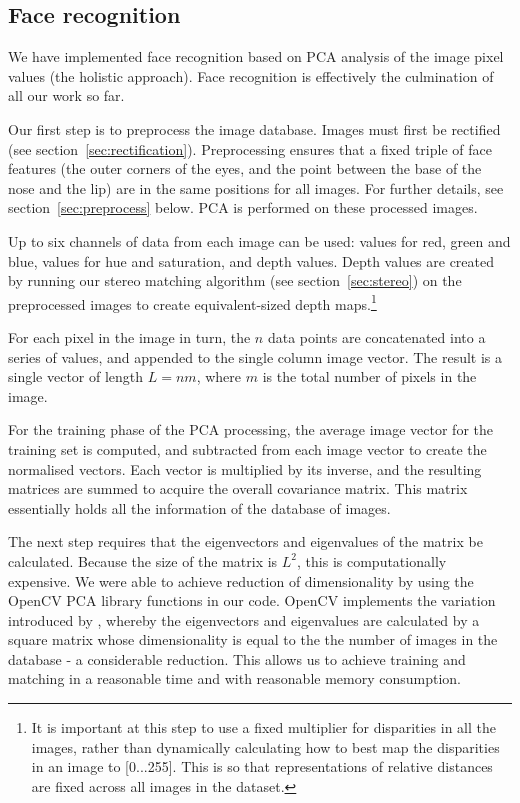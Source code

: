 
\subsection{Face recognition}
\label{sec:face-rec}
We have implemented face recognition based on PCA analysis of the image pixel
values (the holistic approach). Face recognition is effectively the culmination of all our work so far.

Our first step is to preprocess the image database. Images must first be rectified (see section~\ref{sec:rectification}). Preprocessing ensures that a fixed triple of face features (the outer corners of the eyes, and the point between the base of the nose and the lip) are in the same positions for all images. For further details, see section~\ref{sec:preprocess} below. PCA is performed on these processed images.

Up to six channels of data from each image can be used: values for red, green and blue, values for hue and saturation, and depth values. Depth values are created by running our stereo matching algorithm (see section~\ref{sec:stereo}) on the preprocessed images to create equivalent-sized depth maps.\footnote{ It is important at this step to use a fixed multiplier for disparities in all the images, rather than dynamically calculating how to best map the disparities in an image to [0...255]. This is so that representations of relative distances are fixed across all images in the dataset.}

For each pixel in the image in turn, the $n$ data points are concatenated into a series of values, and appended to the single column image vector. The result is a single vector of length $L = nm$, where $m$ is the total number of pixels in the image.

For the training phase of the PCA processing, the average image vector for the
training set is computed, and subtracted from each image vector to create the normalised vectors. Each vector is multiplied by its inverse, and the resulting matrices are summed to acquire the overall covariance matrix. This matrix essentially holds all the information of the database of images.

The next step requires that the eigenvectors and eigenvalues of the matrix be calculated. Because the size of the matrix is $L^{2}$, this is computationally expensive. We were able to achieve reduction of dimensionality by using the OpenCV PCA library functions in our code. OpenCV implements the variation introduced by \citet{turk_pentland}, whereby the eigenvectors and eigenvalues are calculated by a square matrix whose dimensionality is equal to the the number of images in the database - a considerable reduction. This allows us to achieve training and matching in a reasonable time and with reasonable memory consumption.


